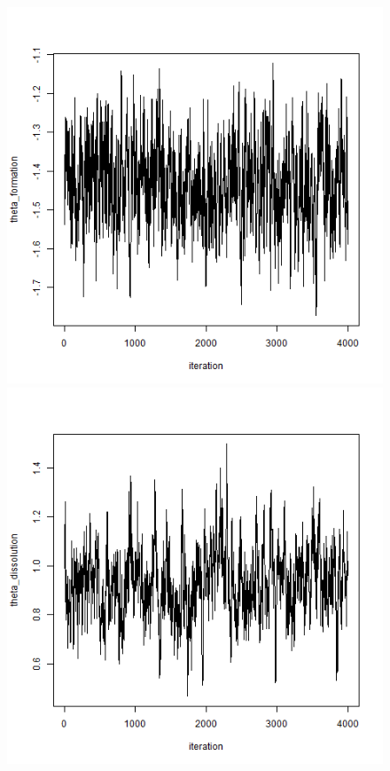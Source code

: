 \documentclass[aspectratio=169,ignorenonframetext,9pt]{beamer}
\theoremstyle{plain}
\theoremstyle{definition}
\begin{document}
\begin{figure}[h]
    \begin{center}
        \includegraphics[scale=0.23]{pictures/net2seq_chain1_BSTERGM_formation_traceplot.png}
        \includegraphics[scale=0.23]{pictures/net2seq_chain1_BSTERGM_dissolution_traceplot.png} \\

\end{center}
\end{figure}
\end{document}
